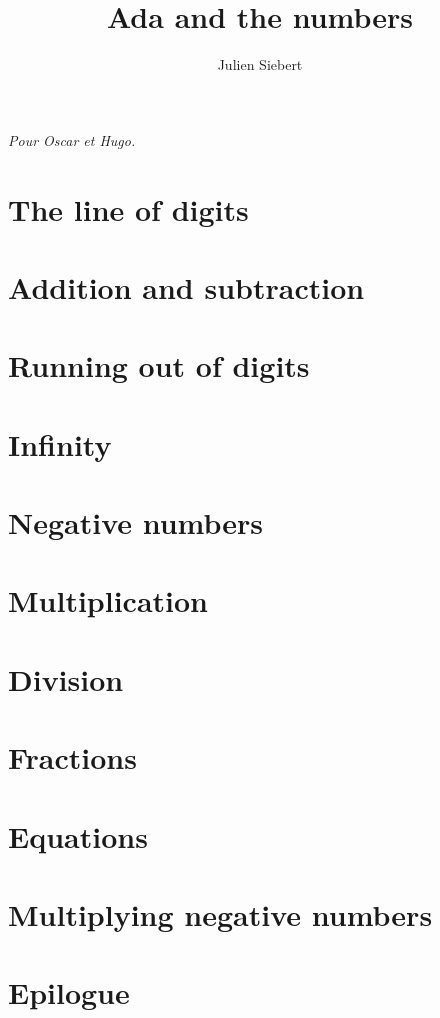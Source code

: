 \documentclass[a5paper,11pt,onecolumn]{book}
\title{Ada and the numbers}
\author{Julien Siebert}
\begin{document}
\maketitle
\textit{Pour Oscar et Hugo.}
\chapter{The line of digits}

\chapter[]{Addition and subtraction}

\chapter[]{Running out of digits}

\chapter[]{Infinity}

\chapter[]{Negative numbers}

\chapter[]{Multiplication}

\chapter[]{Division}

\chapter[]{Fractions}

\chapter[]{Equations}

\chapter[]{Multiplying negative numbers}

\chapter[]{Epilogue}

\end{document}
